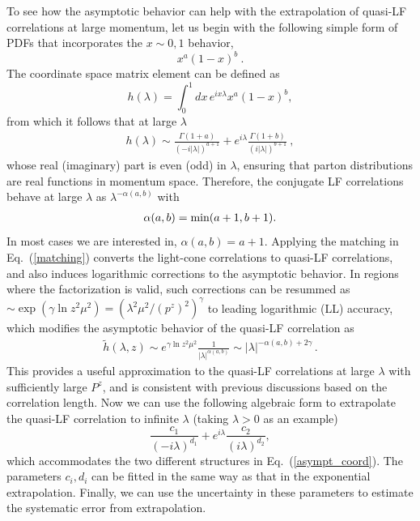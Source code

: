 \documentclass[preprint,12pt]{elsarticle}
\begin{document}
To see how the asymptotic behavior can help with the extrapolation of quasi-LF correlations at large momentum, let us begin with the following simple form of PDFs that incorporates the $x\sim 0, 1$ behavior,
\begin{equation}
     x^a (1-x)^b \ .
\end{equation}
The coordinate space matrix element can be defined as
\begin{equation}
h(\lambda)=\int_0^1 dx \, e^{i x\lambda}x^a (1-x)^b,
\end{equation}
from which it follows that at large $\lambda$
\begin{align}\label{asympt_coord}
h(\lambda)\sim\frac{\Gamma(1+a)}{(-i|\lambda|)^{a+1}}+e^{i\lambda}\frac{\Gamma(1+b)}{(i|\lambda|)^{b+1}} \ ,
\end{align}
whose real (imaginary) part is even (odd) in $\lambda$, ensuring that parton distributions are real functions in momentum space. Therefore, the conjugate LF correlations behave at large $\lambda$ as $\lambda^{-\alpha(a,b)}$ with
\begin{align}
\alpha(a,b)=\text{\rm min}(a+1,b+1).
\end{align}
In most cases we are interested in, $\alpha(a,b)=a+1$. Applying the matching in Eq.~(\ref{matching}) converts the light-cone correlations to quasi-LF correlations, and also induces logarithmic corrections to the asymptotic behavior. In regions where the factorization is valid, such corrections can be resummed as $\sim \exp(\gamma \ln z^2\mu^2)=(\lambda^2\mu^2/(p^z)^2)^\gamma$ to leading logarithmic (LL) accuracy, which modifies the asymptotic behavior of the quasi-LF correlation as
\begin{align}\label{asymphtilde}
\tilde h(\lambda,z)\sim e^{\gamma \ln z^2\mu^2}\frac{1}{|\lambda|^{\alpha(a,b)}}\sim |\lambda|^{-\alpha(a,b)+2\gamma }  \,.
\end{align}
This provides a useful approximation to the quasi-LF correlations at large $\lambda$ with sufficiently large $P^z$, and is consistent with previous discussions based on the correlation length.
Now we can use the following algebraic form to extrapolate the quasi-LF correlation to infinite $\lambda$ (taking $\lambda>0$ as an example)
\begin{equation}\label{extrap}
\frac{c_1}{(-i \lambda)^{d_1}}+e^{i\lambda}\frac{c_2}{(i \lambda)^{d_2}},
\end{equation}
which accommodates the two different structures in Eq.~(\ref{asympt_coord}). The parameters $c_i, d_i$ can be fitted in the same way as that in the exponential extrapolation. Finally, we can use the uncertainty in these parameters to estimate the systematic error from extrapolation.
\end{document}
